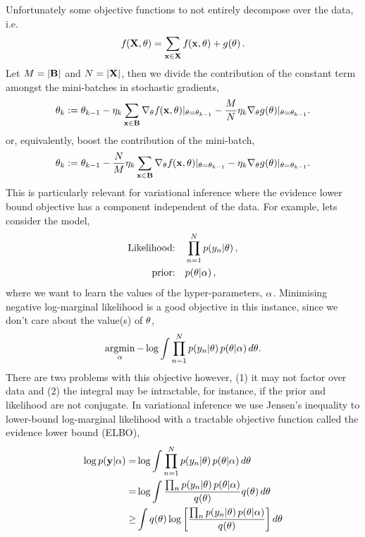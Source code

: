 \documentclass[11pt, oneside]{article}
\begin{document}
Unfortunately some objective functions to not entirely decompose over the data,
i.e. 
\begin{equation}
    {f}_{}\!\left({{\mathbf{X}, \theta}}\right) = \sum_{\mathbf{x} \in \mathbf{X}} {f}_{}\!\left({{\mathbf{x}, \theta}}\right)
    + {g}_{}\!\left({{\theta}}\right).
    \label{eq:objwconst}
\end{equation}
Let $M = |\mathbf{B}|$ and $N = |\mathbf{X}|$, then we divide the contribution of the
constant term amongst the mini-batches in stochastic gradients,
\begin{equation}
    \theta_k := \theta_{k-1} - \eta_k \sum_{\mathbf{x} \in \mathbf{B}}
    \nabla_{\theta} {f}_{}\!\left({{\mathbf{x}, \theta}}\right)\!|_{\theta = \theta_{k-1}}
    - \frac{M}{N} \eta_k \nabla_{\theta} 
    {g}_{}\!\left({{\theta}}\right)\!|_{\theta = \theta_{k-1}}.
    \label{eq:wsg}
\end{equation} 
or, equivalently, boost the contribution of the mini-batch,
\begin{equation}
    \theta_k := \theta_{k-1} - \frac{N}{M} \eta_k \sum_{\mathbf{x} \in \mathbf{B}}
    \nabla_{\theta} {f}_{}\!\left({{\mathbf{x}, \theta}}\right)\!|_{\theta = \theta_{k-1}}
    - \eta_k \nabla_{\theta} 
    {g}_{}\!\left({{\theta}}\right)\!|_{\theta = \theta_{k-1}}.
    \label{eq:wsg2}
\end{equation} 
This is particularly relevant for variational inference where the evidence
lower bound objective has a component independent of the data. For example, 
lets consider the model,
\begin{align}
    \text{Likelihood:} \quad &\prod^N_{n=1} p\!\left({y_n}\middle\vert{\ensuremath{\theta}}\right), \\
    \text{prior:} \quad &p\!\left({\theta}\middle\vert{\ensuremath{\alpha}}\right),
\end{align}
where we want to learn the values of the hyper-parameters, $\alpha$. Minimising
negative log-marginal likelihood is a good objective in this instance, since we
don't care about the value(s) of $\theta$,
\begin{equation}
    \operatorname*{\operatorname*{argmin}}_{\alpha} - \log \int \prod^N_{n=1} p\!\left({y_n}\middle\vert{\ensuremath{\theta}}\right)
    p\!\left({\theta}\middle\vert{\ensuremath{\alpha}}\right) d \theta.
    \label{eq:lml}
\end{equation}
There are two problems with this objective however, (1) it may not factor over
data and (2) the integral may be intractable, for instance, if the prior and
likelihood are not conjugate. In variational inference we use Jensen's
inequality to lower-bound log-marginal likelihood with a tractable objective
function called the evidence lower bound (ELBO),
\begin{align}
    \log \probC{\targ}{\hyper} =& \log \int 
        \prod^N_{n=1} \probC{\targs_n}{\param} 
        \probC{\param}{\hyper} d \param \nonumber \\
        =& \log \int 
        \frac{\prod_n \probC{\targs_n}{\param} \probC{\param}{\hyper}}
        {\qrob{\param}} \qrob{\param} d \param \nonumber \\
        \geq& \int \qrob{\param} \log \sbrac{%
            \frac{\prod_n \probC{\targs_n}{\param} 
            \probC{\param}{\hyper}}{\qrob{\param}}}
        d \param
\end{align}
\end{document}
